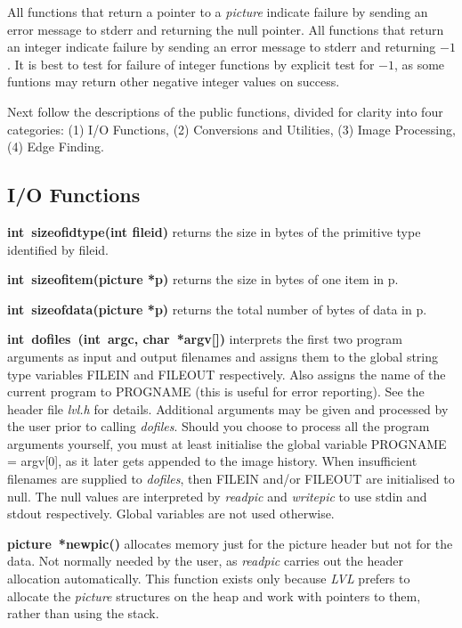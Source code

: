 \documentclass[11pt,twoside,english,a4paper]{article}
\begin{document}
All functions that return a pointer to a \emph{picture} indicate failure by
sending an error message to stderr and returning the null pointer.
All functions that return an integer indicate failure by sending an
error message to stderr and returning $-1$. 
It is best to test for failure of integer functions by explicit
test for $-1$, as some funtions may return other negative 
integer values on success.

Next follow the descriptions of the public functions, 
divided for clarity into four categories: (1) I/O Functions, (2) Conversions and Utilities, (3) Image Processing, 
(4) Edge Finding.

\subsection{I/O Functions}
\textbf{int~sizeofidtype(int fileid)} returns the size in bytes of the primitive type identified by fileid.

\textbf{int~sizeofitem(picture *p)} returns the size in bytes of one item in p.

\textbf{int~sizeofdata(picture *p)} returns the total number of bytes of data in p.

\textbf{int~dofiles~(int~argc, char~{*}argv{[}])} interprets the
first two program arguments as input and output filenames and assigns
them to the global string type variables FILEIN and FILEOUT respectively. 
Also assigns the name of the current program to PROGNAME 
(this is useful for error reporting). See the header file \emph{lvl.h} for details.
Additional arguments may be given and processed by the user prior
to calling \emph{dofiles}. Should you choose to process all the program
arguments yourself, you must at least initialise the global variable
PROGNAME = argv{[}0], as it later gets appended to the image history.
When insufficient filenames are supplied to \emph{dofiles}, 
then FILEIN and/or FILEOUT are initialised to null. 
The null values are interpreted by  \emph{readpic} and \emph{writepic} to use stdin 
and stdout respectively. Global variables are not used otherwise.
 
\textbf{picture~{*}newpic()} allocates memory just for the picture header but not for the data. 
Not normally needed by the user, as \emph{readpic} carries out the 
header allocation automatically.
This function exists only because \emph{LVL} prefers to 
allocate the \emph{picture} structures on the heap and work with 
pointers to them, rather than using the stack.
\end{document}
